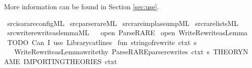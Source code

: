 \begin{isabellebody}
\begin{isamarkuptext}
More information can be found in Section \ref{sec:use}.%
\end{isamarkuptext}\isamarkuptrue%
%
\isadelimdocument
%
\endisadelimdocument
%
\isatagdocument
%
\isamarkuptrue%
%
\isamarkuptrue%
%
\endisatagdocument
{\isafolddocument}%
%
\isadelimdocument
%
\endisadelimdocument
%
\isadelimML
%
\endisadelimML
%
\isatagML
{}\isamarkupfalse%
\ {\isacartoucheopen}src{\isacharslash}{\kern0pt}isarare{\isacharunderscore}{\kern0pt}config{\isachardot}{\kern0pt}ML{\isacartoucheclose}\isanewline
{}\isamarkupfalse%
\ {\isacartoucheopen}src{\isacharslash}{\kern0pt}parse{\isacharunderscore}{\kern0pt}rare{\isachardot}{\kern0pt}ML{\isacartoucheclose}\isanewline
{}\isamarkupfalse%
\ {\isacartoucheopen}src{\isacharslash}{\kern0pt}rare{\isacharunderscore}{\kern0pt}impl{\isacharunderscore}{\kern0pt}assump{\isachardot}{\kern0pt}ML{\isacartoucheclose}\isanewline
{}\isamarkupfalse%
\ {\isacartoucheopen}src{\isacharslash}{\kern0pt}rare{\isacharunderscore}{\kern0pt}lists{\isachardot}{\kern0pt}ML{\isacartoucheclose}\isanewline
{}\isamarkupfalse%
\ {\isacartoucheopen}src{\isacharslash}{\kern0pt}write{\isacharunderscore}{\kern0pt}rewrite{\isacharunderscore}{\kern0pt}as{\isacharunderscore}{\kern0pt}lemma{\isachardot}{\kern0pt}ML{\isacartoucheclose}\isanewline
\isanewline
\isanewline
\isanewline
\isanewline
\isanewline
\isanewline
\isanewline
{}\isamarkupfalse%
\ {\isacartoucheopen}\isanewline
\ open\ Parse{\isacharunderscore}{\kern0pt}RARE\isanewline
\ open\ Write{\isacharunderscore}{\kern0pt}Rewrite{\isacharunderscore}{\kern0pt}as{\isacharunderscore}{\kern0pt}Lemma\isanewline
\isanewline
\ {\isacharparenleft}{\kern0pt}{\isacharasterisk}{\kern0pt}TODO{\isacharcolon}{\kern0pt}\ Can\ I\ use{\isacharcolon}{\kern0pt}\ Library{\isachardot}{\kern0pt}cat{\isacharunderscore}{\kern0pt}lines{\isacharquery}{\kern0pt}{\isacharasterisk}{\kern0pt}{\isacharparenright}{\kern0pt}\isanewline
\ fun\ string{\isacharunderscore}{\kern0pt}of{\isacharunderscore}{\kern0pt}rewrite\ ctxt\ s\isanewline
\ \ {\isacharequal}{\kern0pt}\ {\isacharparenleft}{\kern0pt}Write{\isacharunderscore}{\kern0pt}Rewrite{\isacharunderscore}{\kern0pt}as{\isacharunderscore}{\kern0pt}Lemma{\isachardot}{\kern0pt}write{\isacharunderscore}{\kern0pt}thy\ {\isacharparenleft}{\kern0pt}Parse{\isacharunderscore}{\kern0pt}RARE{\isachardot}{\kern0pt}parse{\isacharunderscore}{\kern0pt}rewrites\ ctxt\ {\isacharbrackleft}{\kern0pt}s{\isacharbrackright}{\kern0pt}{\isacharparenright}{\kern0pt}\ {\isachardoublequote}{\kern0pt}THEORY{\isacharunderscore}{\kern0pt}NAME{\isachardoublequote}{\kern0pt}\ {\isachardoublequote}{\kern0pt}IMPORTING{\isacharunderscore}{\kern0pt}THEORIES{\isachardoublequote}{\kern0pt}\ ctxt{\isacharparenright}{\kern0pt}\isanewline

\end{isabellebody}
